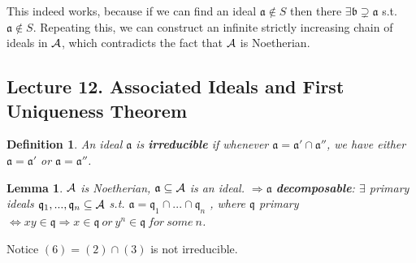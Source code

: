 \documentclass[11pt]{article}
\newtheorem{lemma}[thm]{Lemma}
\newtheorem{dfn}[thm]{Definition}
\newcommand{\sca}{{\mathfrak a}}
\newcommand{\scb}{{\mathfrak b}}
\newcommand{\scq}{\mathfrak q}
\newcommand{\cala}{{\cal A}}
\newcommand{\Lrta}{\Longrightarrow}
\newcommand{\Llrta}{\Longleftrightarrow}
\begin{document}
 This indeed works, because if we can find an ideal $\sca\notin S$ then there $\exists \scb\supsetneq \sca$ s.t. $\sca\notin S$. Repeating this, we can construct an infinite strictly increasing chain of ideals in $\cala$, which contradicts the fact that $\cala$ is Noetherian. 
\subsection{Lecture 12. Associated Ideals and First Uniqueness Theorem}
\begin{dfn}
An ideal $\sca$ is \textbf{irreducible} if whenever $\sca=\sca'\cap \sca''$, we have either $\sca=\sca'$ or $\sca=\sca''$.
\end{dfn}
\begin{lemma}
$\cala$ is Noetherian, $\sca\subseteq \cala$ is an ideal. $\Lrta\sca$ \textbf{decomposable}:
$\exists $ primary ideals $\scq_1,...,\scq_n\subseteq \cala$ s.t. $\sca=\scq_1\cap...\cap\scq_n$
, where $\scq$ primary $\Llrta x y\in \scq\Lrta x\in \scq\ or\ y^n\in \scq\ for\ some \ n$.
\end{lemma}
Notice $(6)=(2)\cap(3)$ is not irreducible.
\end{document}

